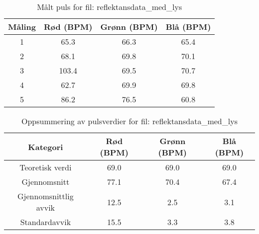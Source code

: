 
\begin{table}[H]
\centering
\caption{Målt puls for fil: reflektansdata\_med\_lys}
\label{tab:reflektansdata\_med\_lys}
\begin{tabular}{|c|c|c|c|}
\hline
\textbf{Måling} & \textbf{Rød (BPM)} & \textbf{Grønn (BPM)} & \textbf{Blå (BPM)} \\ \hline
1 & 65.3 & 66.3 & 65.4 \\ \hline
2 & 68.1 & 69.8 & 70.1 \\ \hline
3 & 103.4 & 69.5 & 70.7 \\ \hline
4 & 62.7 & 69.9 & 69.8 \\ \hline
5 & 86.2 & 76.5 & 60.8 \\ \hline
\end{tabular}
\end{table}

\begin{table}[H]
\centering
\caption{Oppsummering av pulsverdier for fil: reflektansdata\_med\_lys}
\label{tab:reflektansdata\_med\_lys_summary}
\begin{tabular}{|c|c|c|c|}
\hline
\textbf{Kategori} & \textbf{Rød (BPM)} & \textbf{Grønn (BPM)} & \textbf{Blå (BPM)} \\ \hline
Teoretisk verdi & 69.0 & 69.0 & 69.0 \\ \hline
Gjennomsnitt & 77.1 & 70.4 & 67.4 \\ \hline
Gjennomsnittlig avvik & 12.5 & 2.5 & 3.1 \\ \hline
Standardavvik & 15.5 & 3.3 & 3.8 \\ \hline
\end{tabular}
\end{table}